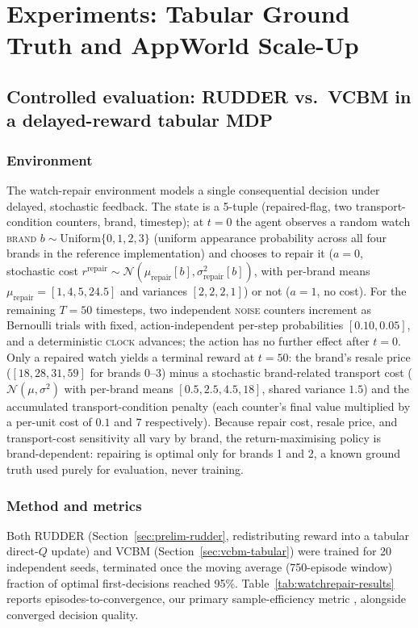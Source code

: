 \documentclass[conference]{IEEEtran}
\begin{document}
\section{Experiments: Tabular Ground Truth and AppWorld Scale-Up}
\label{sec:experiments}

\subsection{Controlled evaluation: RUDDER vs.\ VCBM in a delayed-reward tabular MDP}
\label{sec:exp-watchrepair}

\subsubsection{Environment}
The watch-repair environment models a single consequential decision under delayed, stochastic feedback. The state is a 5-tuple (repaired-flag, two transport-condition counters, brand, timestep); at $t=0$ the agent observes a random watch \textsc{brand} $b \sim \mathrm{Uniform}\{0,1,2,3\}$ (uniform appearance probability across all four brands in the reference implementation) and chooses to repair it ($a=0$, stochastic cost $r^{\mathrm{repair}} \sim \mathcal{N}(\mu_{\mathrm{repair}}[b], \sigma^2_{\mathrm{repair}}[b])$, with per-brand means $\mu_{\mathrm{repair}} = [1, 4, 5, 24.5]$ and variances $[2, 2, 2, 1]$) or not ($a=1$, no cost). For the remaining $T=50$ timesteps, two independent \textsc{noise} counters increment as Bernoulli trials with fixed, action-independent per-step probabilities $[0.10, 0.05]$, and a deterministic \textsc{clock} advances; the action has no further effect after $t=0$. Only a repaired watch yields a terminal reward at $t=50$: the brand's resale price ($[18, 28, 31, 59]$ for brands 0--3) minus a stochastic brand-related transport cost ($\mathcal{N}(\mu, \sigma^2)$ with per-brand means $[0.5, 2.5, 4.5, 18]$, shared variance $1.5$) and the accumulated transport-condition penalty (each counter's final value multiplied by a per-unit cost of $0.1$ and $7$ respectively). Because repair cost, resale price, and transport-cost sensitivity all vary by brand, the return-maximising policy is brand-dependent: repairing is optimal only for brands 1 and 2, a known ground truth used purely for evaluation, never training.

\subsubsection{Method and metrics}
Both RUDDER (Section~\ref{sec:prelim-rudder}, redistributing reward into a tabular direct-$Q$ update) and VCBM (Section~\ref{sec:vcbm-tabular}) were trained for 20 independent seeds, terminated once the moving average (750-episode window) fraction of optimal first-decisions reached 95\%. Table~\ref{tab:watchrepair-results} reports episodes-to-convergence, our primary sample-efficiency metric \cite{b_levine2020offlinerl}, alongside converged decision quality.
\end{document}
